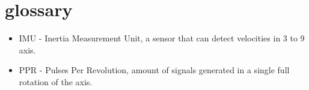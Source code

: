 \section{glossary}
\begin{itemize}
\item \label{trm::imu} IMU - Inertia Measurement Unit, a sensor that can detect velocities in 3 to 9 axis.
\item \label{trm::PPR} PPR - Pulses Per Revolution, amount of signals generated in a single full rotation of the axis.
\end{itemize}
